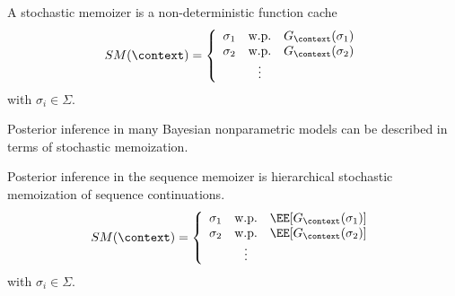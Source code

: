\documentclass[16pt]{beamer}
\begin{document}
\begin{frame}[t]{}
A stochastic memoizer \cite{Goodman2008} is a non-deterministic function cache 
\begin{align*}
SM(\context) = \left\{\begin{array}{ccc}
\sigma_1  & \mbox{w.p.}  &  G_\context(\sigma_1) \\
\sigma_2  & \mbox{w.p.}  &  G_\context(\sigma_2)  \\
  &  \vdots &   
\end{array}\right.
\end{align*}
with $\sigma_i \in \Sigma$.
\vspace{.5cm}

Posterior inference in many Bayesian nonparametric models can be described in terms of stochastic memoization. 
\end{frame}

\begin{frame}[t]{}
Posterior inference in the sequence memoizer is hierarchical stochastic memoization of sequence continuations. 
\begin{align*}
SM(\context) = \left\{\begin{array}{ccc}
\sigma_1  & \mbox{w.p.}  &  \EE[G_\context(\sigma_1)] \\
\sigma_2  & \mbox{w.p.}  &  \EE[G_\context(\sigma_2)]  \\
  &  \vdots &   
\end{array}\right.
\end{align*}
with $\sigma_i \in \Sigma$.
\vspace{.5cm}
\end{frame}
\end{document}
